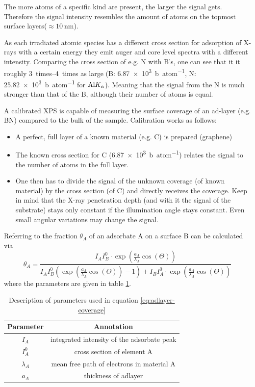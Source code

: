 The more atoms of a specific kind are present, the larger the signal gets. Therefore the signal intensity resembles the amount of atoms on the topmost surface layers($\approx \SI{10}{\nm}$).

As each irradiated atomic species has a different cross section for adsorption of X-rays with a certain energy they emit auger and core level spectra with a different intensity. Comparing the cross section of e.g. N with B's, one can see that it it roughly \SIrange{3}{4}{times} as large (B: \SI{6,87e3}{\barn\per atom}, N: \SI{25,82e3}{\barn\per atom} for $\textnormal{Al} K_{\alpha}$)\cite{henke_x-ray_1993}. Meaning that the signal from the N is much stronger than that of the B, although their number of atoms is equal.

A calibrated XPS is capable of measuring the surface coverage of an ad-layer (e.g. BN) compared to the bulk of the sample. Calibration works as follows:
\begin{itemize}
 \item A perfect, full layer of a known material (e.g. C) is prepared (graphene)
 \item The known cross section for C (\SI{6,87e3}{\barn\per atom})\cite{henke_x-ray_1993} relates the signal to the number of atoms in the full layer.
 \item One then has to divide the signal of the unknown coverage (of known material) by the cross section (of C) and directly receives the coverage. Keep in mind that the X-ray penetration depth (and with it the signal of the substrate) stays only constant if the illumination angle stays constant. Even small angular variations may change the signal.
\end{itemize}
Referring to \cite{ertl_low_1986} the fraction $\theta_A$ of an adsorbate A on a surface B can be calculated via
\begin{equation}\label{eq:adlayer-coverage}
 \theta_A=\frac{I_AI_B^0\cdot \exp(\frac{a_A}{\lambda_A}\cos(\Theta))}{I_AI_B^0( \exp(\frac{a_A}{\lambda_A}\cos(\Theta))-1)+I_BI_A^0\cdot \exp(\frac{a_A}{\lambda_A}\cos(\Theta))}
\end{equation}
where the parameters are given in table \ref{tab:adlayer-coverage-parameters}.

\begin{table}[h!]\centering
\caption{Description of parameters used in equation
\ref{eq:adlayer-coverage}}
\label{tab:adlayer-coverage-parameters}
 \begin{tabular}{cc}
  Parameter & Annotation \\ \hline
  $I_A$	& integrated intensity of the adsorbate peak \\
  $I_A^0$ & cross section of element A \\
  $\lambda_A$ & mean free path of electrons in material A \\
  $a_A$ & thickness of adlayer \\
 \end{tabular}
\end{table}

